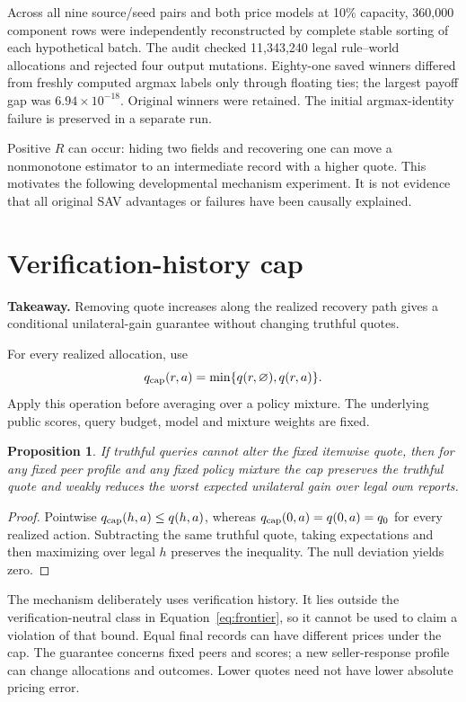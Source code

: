 \documentclass[11pt]{article}
\newtheorem{proposition}{Proposition}
\begin{document}
Across all nine source/seed pairs and both price models at 10\% capacity,
360,000 component rows were independently reconstructed by complete stable
sorting of each hypothetical batch. The audit checked 11,343,240 legal
rule--world allocations and rejected four output mutations. Eighty-one saved
winners differed from freshly computed argmax labels only through floating
ties; the largest payoff gap was $6.94\times10^{-18}$. Original winners were
retained. The initial argmax-identity failure is preserved in a separate run.

Positive $R$ can occur: hiding two fields and recovering one can move a
nonmonotone estimator to an intermediate record with a higher quote. This
motivates the following developmental mechanism experiment. It is not evidence
that all original SAV advantages or failures have been causally explained.

\section{Verification-history cap}
\noindent\textbf{Takeaway.} Removing quote increases along the realized recovery
path gives a conditional unilateral-gain guarantee without changing truthful quotes.

For every realized allocation, use
\begin{equation}
 q_{\rm cap}(r,a)=\min\{q(r,\varnothing),q(r,a)\}.
\end{equation}
Apply this operation before averaging over a policy mixture. The underlying
public scores, query budget, model and mixture weights are fixed.

\begin{proposition}
If truthful queries cannot alter the fixed itemwise quote, then for any fixed
peer profile and any fixed policy mixture the cap preserves the truthful quote
and weakly reduces the worst expected unilateral gain over legal own reports.
\end{proposition}
\begin{proof}
Pointwise $q_{\rm cap}(h,a)\le q(h,a)$, whereas
$q_{\rm cap}(0,a)=q(0,a)=q_0$ for every realized action. Subtracting the same
truthful quote, taking expectations and then maximizing over legal $h$ preserves
the inequality. The null deviation yields zero.\end{proof}

The mechanism deliberately uses verification history. It lies outside the
verification-neutral class in Equation~\eqref{eq:frontier}, so it cannot be used
to claim a violation of that bound. Equal final records can have different
prices under the cap. The guarantee concerns fixed peers and scores; a new
seller-response profile can change allocations and outcomes. Lower quotes need
not have lower absolute pricing error.
\end{document}
